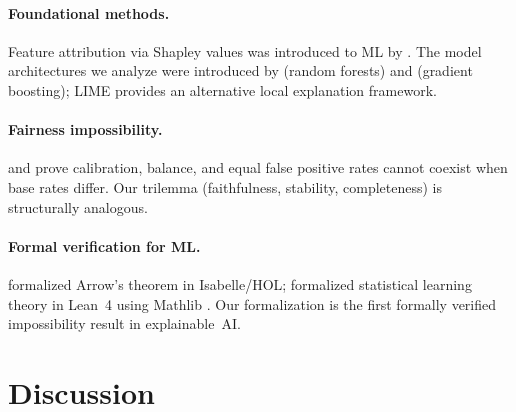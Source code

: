 \documentclass{article}
\begin{document}
\paragraph{Foundational methods.}
Feature attribution via Shapley values \citep{shapley1953value} was introduced to ML by \citet{lundberg2017unified}.
The model architectures we analyze were introduced by \citet{breiman2001random} (random forests) and \citet{friedman2001greedy} (gradient boosting); LIME \citep{ribeiro2016should} provides an alternative local explanation framework.

\paragraph{Fairness impossibility.}
\citet{chouldechova2017fair} and \citet{kleinberg2017inherent} prove calibration, balance, and equal false positive rates cannot coexist when base rates differ. Our trilemma (faithfulness, stability, completeness) is structurally analogous.

\paragraph{Formal verification for ML.}
\begin{sloppypar}
\citet{nipkow2009social} formalized Arrow's theorem in Isabelle/HOL; \citet{zhang2026statistical} formalized statistical learning theory in Lean~4 \citep{demoura2021lean4} using Mathlib \citep{mathlib2020}. Our formalization is the first formally verified impossibility result in explainable~AI.
\end{sloppypar}

\endgroup%

\section{Discussion}
\label{sec:discussion}
\end{document}
